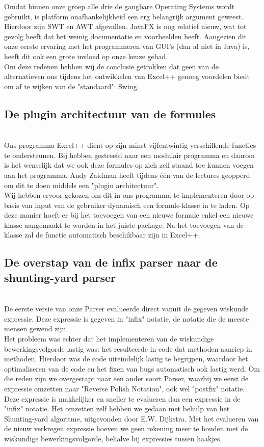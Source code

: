 \documentclass[a4paper,11pt]{article}
\begin{document}
Omdat binnen onze groep alle drie de gangbare Operating Systems wordt gebruikt, is platform onafhankelijkheid een erg belangrijk argument geweest. Hierdoor zijn SWT en AWT afgevallen. JavaFX is nog relatief nieuw, wat tot gevolg heeft dat het weinig documentatie en voorbeelden heeft. Aangezien dit onze eerste ervaring met het programmeren van GUI's (dan al niet in Java) is, heeft dit ook een grote invloed op onze keuze gehad.\\

Om deze redenen hebben wij de conclusie getrokken dat geen van de alternatieven ons tijdens het ontwikkelen van Excel++ genoeg voordelen biedt om af te wijken van de "standaard": Swing.\\

\subsection{De plugin architectuur van de formules}\mbox{}\\
Ons programma Excel++ dient op zijn minst vijfentwintig verschillende functies te ondersteunen. Bij hebben gestreefd naar een modulair programma en daarom is het wenselijk dat we ook deze formules op zich zelf staand toe kunnen voegen aan het programma. Andy Zaidman heeft tijdens één van de lectures geopperd om dit te doen middels een "plugin architectuur".\\

Wij hebben ervoor gekozen om dit in ons programma te implementeren door op basis van input van de gebruiker dynamisch een formule-klasse in te laden. Op deze manier hoeft er bij het toevoegen van een nieuwe formule enkel een nieuwe klasse aangemaakt te worden in het juiste package. Na het toevoegen van de klasse zal de functie automatisch beschikbaar zijn in Excel++.\\

\subsection{De overstap van de infix parser naar de shunting-yard parser}\mbox{}\\
De eerste versie van onze Parser evalueerde direct vanuit de gegeven wiskunde expressie. Deze expressie is gegeven in "infix" notatie, de notatie die de meeste mensen gewend zijn.\\

Het probleem was echter dat het implementeren van de wiskundige bewerkingsvolgorde lastig was: het resulteerde in code dat methoden aanriep in methoden. Hierdoor was de code uiteindelijk lastig te begrijpen, waardoor het optimaliseren van de code en het fixen van bugs automatisch ook lastig werd. Om die reden zijn we overgestapt naar een ander soort Parser, waarbij we eerst de expressie omzetten naar "Reverse Polish Notation", ook wel "postfix" notatie. Deze expressie is makkelijker en sneller te evalueren dan een expressie in de "infix" notatie. Het omzetten zelf hebben we gedaan met behulp van het Shunting-yard algoritme, uitgevonden door E.W. Dijkstra. Met het evalueren van de nieuw verkregen expressie hoeven we geen rekening meer te houden met de wiskundige bewerkingsvolgorde, behalve bij expressies tussen haakjes.\\
\end{document}
